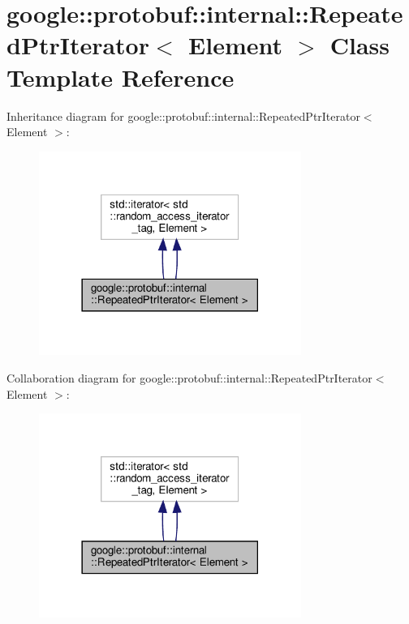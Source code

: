 \hypertarget{classgoogle_1_1protobuf_1_1internal_1_1RepeatedPtrIterator}{}\section{google\+:\+:protobuf\+:\+:internal\+:\+:Repeated\+Ptr\+Iterator$<$ Element $>$ Class Template Reference}
\label{classgoogle_1_1protobuf_1_1internal_1_1RepeatedPtrIterator}


Inheritance diagram for google\+:\+:protobuf\+:\+:internal\+:\+:Repeated\+Ptr\+Iterator$<$ Element $>$\+:
\nopagebreak
\begin{figure}[H]
\begin{center}
\leavevmode
\includegraphics[width=242pt]{classgoogle_1_1protobuf_1_1internal_1_1RepeatedPtrIterator__inherit__graph}
\end{center}
\end{figure}


Collaboration diagram for google\+:\+:protobuf\+:\+:internal\+:\+:Repeated\+Ptr\+Iterator$<$ Element $>$\+:
\nopagebreak
\begin{figure}[H]
\begin{center}
\leavevmode
\includegraphics[width=242pt]{classgoogle_1_1protobuf_1_1internal_1_1RepeatedPtrIterator__coll__graph}
\end{center}
\end{figure}
